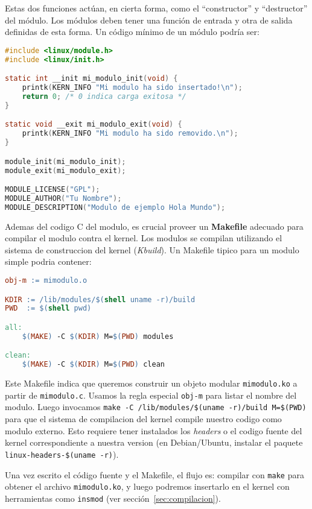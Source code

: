 Estas dos funciones actúan, en cierta forma, como el ``constructor'' y ``destructor'' del módulo. Los módulos deben tener una función de entrada y otra de salida definidas de esta forma. Un código mínimo de un módulo podría ser:

\begin{lstlisting}[language=C]
#include <linux/module.h>
#include <linux/init.h>

static int __init mi_modulo_init(void) {
    printk(KERN_INFO "Mi modulo ha sido insertado!\n");
    return 0; /* 0 indica carga exitosa */
}

static void __exit mi_modulo_exit(void) {
    printk(KERN_INFO "Mi modulo ha sido removido.\n");
}

module_init(mi_modulo_init);
module_exit(mi_modulo_exit);

MODULE_LICENSE("GPL");
MODULE_AUTHOR("Tu Nombre");
MODULE_DESCRIPTION("Modulo de ejemplo Hola Mundo");
\end{lstlisting}

Ademas del codigo C del modulo, es crucial proveer un \textbf{Makefile} adecuado para compilar el modulo contra el kernel. Los modulos se compilan utilizando el sistema de construccion del kernel (\emph{Kbuild}). Un Makefile tipico para un modulo simple podria contener:

\begin{lstlisting}[language=make]
obj-m := mimodulo.o

KDIR := /lib/modules/$(shell uname -r)/build
PWD  := $(shell pwd)

all:
	$(MAKE) -C $(KDIR) M=$(PWD) modules

clean:
	$(MAKE) -C $(KDIR) M=$(PWD) clean
\end{lstlisting}

Este Makefile indica que queremos construir un objeto modular \texttt{mimodulo.ko} a partir de \texttt{mimodulo.c}. Usamos la regla especial \texttt{obj-m} para listar el nombre del modulo. Luego invocamos \texttt{make -C /lib/modules/\$(uname -r)/build M=\$(PWD)} para que el sistema de compilacion del kernel compile nuestro codigo como modulo externo. Esto requiere tener instalados los \emph{headers} o el codigo fuente del kernel correspondiente a nuestra version (en Debian/Ubuntu, instalar el paquete \texttt{linux-headers-\$(uname -r)}).

Una vez escrito el código fuente y el Makefile, el flujo es: compilar con \texttt{make} para obtener el archivo \texttt{mimodulo.ko}, y luego podremos insertarlo en el kernel con herramientas como \texttt{insmod} (ver sección~\ref{sec:compilacion}).

